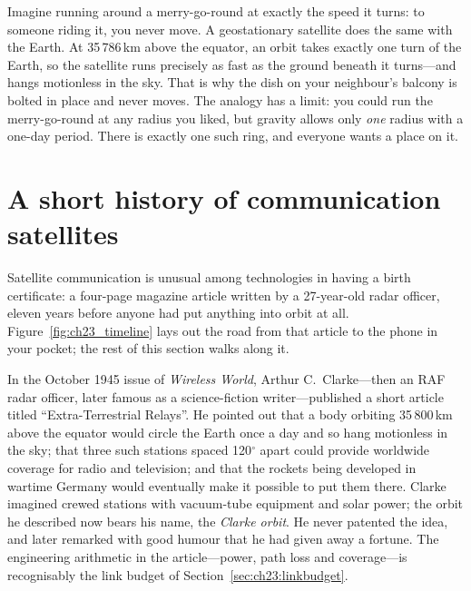 \begin{analogy}
Imagine running around a merry-go-round at exactly the speed it turns: to someone riding it, you
never move. A geostationary satellite does the same with the Earth. At 35\,786\,km above the
equator, an orbit takes exactly one turn of the Earth, so the satellite runs precisely as fast as
the ground beneath it turns---and hangs motionless in the sky. That is why the dish on your
neighbour's balcony is bolted in place and never moves. The analogy has a limit: you could run
the merry-go-round at any radius you liked, but gravity allows only \emph{one} radius with a
one-day period. There is exactly one such ring, and everyone wants a place on it.
\end{analogy}

\section{A short history of communication satellites}
\label{sec:ch23:history}

Satellite communication is unusual among technologies in having a birth certificate: a
four-page magazine article written by a 27-year-old radar officer, eleven years before anyone had
put anything into orbit at all. Figure~\ref{fig:ch23_timeline} lays out the road from that article
to the phone in your pocket; the rest of this section walks along it.


\begin{history}
In the October 1945 issue of \emph{Wireless World}, Arthur C.~Clarke---then an RAF radar
officer, later famous as a science-fiction writer---published a short article titled
``Extra-Terrestrial Relays''. He pointed out that a body orbiting 35\,800\,km above the equator
would circle the Earth once a day and so hang motionless in the sky; that three such stations
spaced 120$^\circ$ apart could provide worldwide coverage for radio and television; and that
the rockets being developed in wartime Germany would eventually make it possible to put them
there. Clarke imagined crewed stations with vacuum-tube equipment and solar power; the
orbit he described now bears his name, the \emph{Clarke orbit}. He never patented the idea,
and later remarked with good humour that he had given away a fortune. The engineering
arithmetic in the article---power, path loss and coverage---is recognisably the link budget of
Section~\ref{sec:ch23:linkbudget}.
\end{history}

